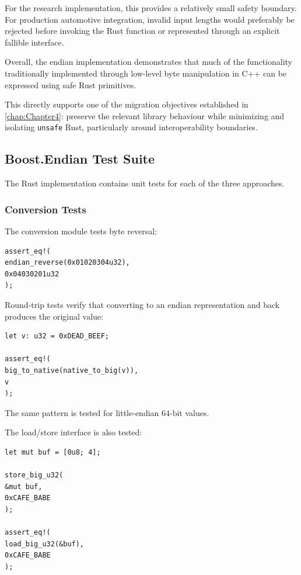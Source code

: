 For the research implementation, this provides a relatively small safety boundary. For production automotive integration, invalid input lengths 
would preferably be rejected before invoking the Rust function or represented through an explicit fallible interface.

Overall, the endian implementation demonstrates that much of the functionality traditionally implemented through low-level byte manipulation in 
C++ can be expressed using safe Rust primitives.

This directly supports one of the migration objectives established in \ref{chap:Chapter4}: preserve the relevant library behaviour 
while minimizing and isolating \texttt{unsafe} Rust, particularly around interoperability boundaries.


\subsection{Boost.Endian Test Suite}

The Rust implementation contains unit tests for each of the three approaches.

\subsubsection{Conversion Tests}

The conversion module tests byte reversal:

\begin{lstlisting}[style=rustblock]
assert_eq!(
endian_reverse(0x01020304u32),
0x04030201u32
);
\end{lstlisting}

Round-trip tests verify that converting to an endian representation and back produces the original value:

\begin{lstlisting}[style=rustblock]
let v: u32 = 0xDEAD_BEEF;

assert_eq!(
big_to_native(native_to_big(v)),
v
);
\end{lstlisting}

The same pattern is tested for little-endian 64-bit values.

The load/store interface is also tested:

\begin{lstlisting}[style=rustblock]
let mut buf = [0u8; 4];

store_big_u32(
&mut buf,
0xCAFE_BABE
);

assert_eq!(
load_big_u32(&buf),
0xCAFE_BABE
);
\end{lstlisting}

